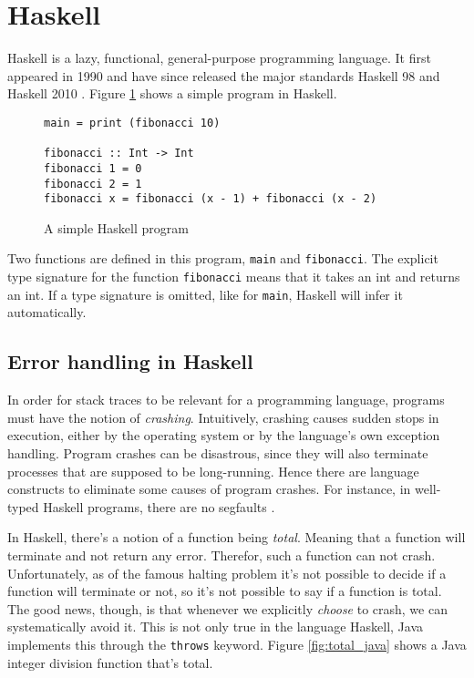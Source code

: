 \section{Haskell}

Haskell is a lazy, functional, general-purpose programming language.
\cite{haskell_report2010}
It first appeared in 1990 \cite{HistoryOfHaskell2007}  and have since
released the major standards Haskell 98 and Haskell 2010
\cite{haskell_report2010}. Figure \ref{fig:simple_program} shows a simple program in Haskell.

\begin{figure}
  \begin{verbatim}
main = print (fibonacci 10)

fibonacci :: Int -> Int
fibonacci 1 = 0
fibonacci 2 = 1
fibonacci x = fibonacci (x - 1) + fibonacci (x - 2)
  \end{verbatim}
  \caption{A simple Haskell program}
  \label{fig:simple_program}
\end{figure}


Two functions are defined in this program, \texttt{main} and
\texttt{fibonacci}.  The explicit type signature for the function
\texttt{fibonacci} means that it takes an int and returns an int. If a type
signature is omitted, like for \texttt{main}, Haskell will infer it automatically.

\subsection{Error handling in Haskell}

In order for stack traces to be relevant for a programming language, programs
must have the notion of \emph{crashing}. Intuitively, crashing causes sudden
stops in execution, either by the operating system or by the language's own
exception handling. Program crashes can be disastrous, since they will also
terminate processes that are supposed to be long-running. Hence there are
language constructs to eliminate some causes of program crashes.
For instance,
in well-typed Haskell programs, there are no segfaults \cite{FindingTheNeedle2009}.

In Haskell, there's a notion of a function being \emph{total}. Meaning that a
function will terminate and not return any error. %
Therefor, such a function can not crash. Unfortunately, as of the famous
halting problem it's not possible to decide if a function will terminate or not, so it's not possible to say if a function is total.
The good news, though, is that whenever we
explicitly \emph{choose} to crash, we can systematically avoid it. This is not
only true in the language Haskell, Java implements this through the
\texttt{throws} keyword. %
Figure \ref{fig:total_java} shows a Java integer division function that's
total.

